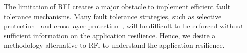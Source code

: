 The limitation of RFI creates a major obstacle to implement efficient fault tolerance mechanisms.
Many fault tolerance strategies, such as selective protection~\cite{sc14:elliott, snl_tr11:Hoemmen} 
and cross-layer protection~\cite{CrossLayer_icpp12, abft_ecc:SC13}, will be difficult
to be enforced without sufficient information on the application resilience.
Hence, we desire a %
methodology alternative to RFI to understand the application resilience.

\begin{comment}
\textbf{paragraph4: what is application-level fault masking}
Application-level fault masking refers to an application remaining with the correct outcome
because the fault is hidden by the application. For example, a corrupted bit in a data structure is overwritten by an assignment statement, hence does not cause incorrect application outcomes; a corrupted bit of a molecular representation in the Monte Carlo method-based simulation to study molecular dynamics does not matter to the application outcome, because of the statistical nature of the simulation.


software-defined resilience;
\footnote{We use the terms \textit{resilience} and \textit{fault tolerance} interchangeably in this paper.}

\textbf{paragraph4: our modeling methodology. Why we can address the limitation?}
\\

\textbf{paragraph5: summarization of our contributions}
\end{comment}

